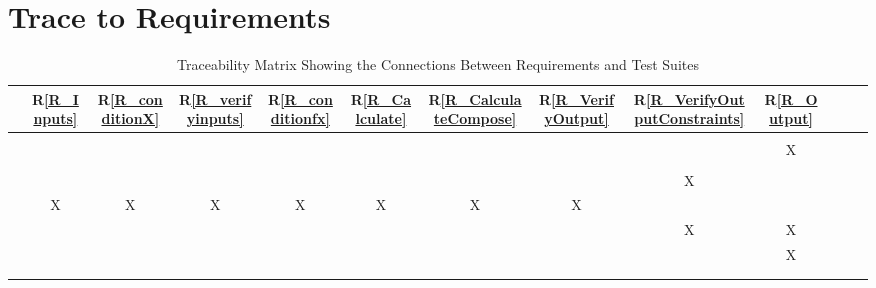 \documentclass[12pt, titlepage]{article}
\newcommand{\rref}[1]{R\ref{#1}}
\begin{document}
\section{Trace to Requirements}

\begin{table}[H]
	\centering
		\begin{tabular}{|c|c|c|c|c|c|c|c|c|c|c|c|c|}
			\hline
			& \rref{R_Inputs}& \rref{R_conditionX} & \rref{R_verifyinputs}& 
			\rref{R_conditionfx} & \rref{R_Calculate}& 
			\rref{R_CalculateCompose}& 
			\rref{R_VerifyOutput} & \rref{R_VerifyOutputConstraints}& 
			\rref{R_Output}\\
			\hline
			  & & & & & & &  &&\\ \hline
			    & & & & & & & &&X\\ \hline 
			   & & & & & & & &&\\ \hline
			      & & & & & && &X &\\ \hline
			     & X&X &X &X &X &X &X &&\\ \hline
			     & & & & & & & &X&X\\ \hline
			  & & & & & & & &&X\\ \hline
			 & & & & & & & &&\\ \hline
			   & & & & & & & &&\\
			\hline
		\end{tabular}
	\caption{Traceability Matrix Showing the Connections Between Requirements 
		and Test Suites}
	\label{Table:R_trace}
\end{table}
		
\end{document}
